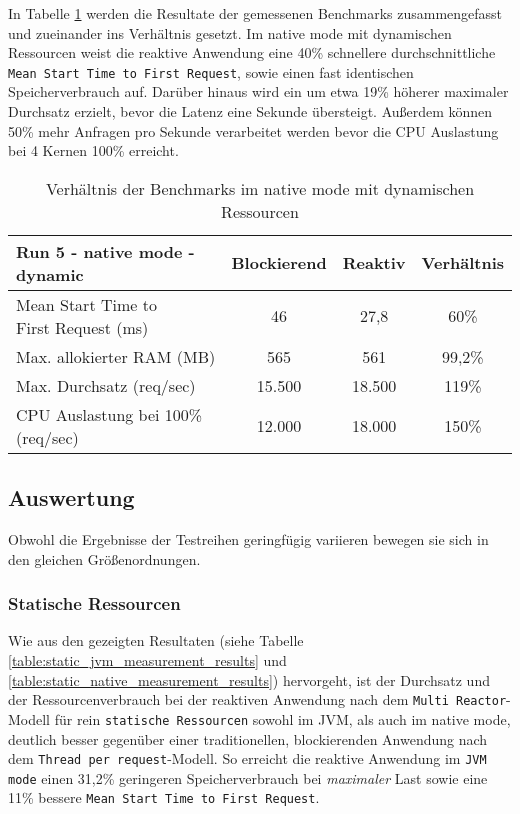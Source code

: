 In Tabelle \ref{table:dynamic_native_measurement_results} werden die Resultate der gemessenen Benchmarks zusammengefasst
und zueinander ins Verhältnis gesetzt. Im native mode mit dynamischen Ressourcen weist die reaktive Anwendung
eine 40\% schnellere durchschnittliche \verb|Mean Start Time to First Request|, sowie einen fast identischen
Speicherverbrauch auf.
Darüber hinaus wird ein um etwa 19\% höherer maximaler Durchsatz erzielt, bevor die Latenz eine Sekunde übersteigt.
Außerdem können 50\% mehr Anfragen pro Sekunde verarbeitet werden bevor die CPU Auslastung bei 4 Kernen 100\% erreicht.

\begin{table}[ht!]
  \begin{tabular}{|l | c | c | c|}
    \hline
    Run 5 - native mode - dynamic & Blockierend & Reaktiv & Verhältnis \\
    \hline
    \makecell[l]{Mean Start Time to                                    \\ First Request (ms)} &   46    &  27,8 &   60\%   \\
    \hline
    Max. allokierter RAM (MB)     & 565         & 561     & 99,2\%     \\
    \hline
    Max. Durchsatz (req/sec)      & 15.500      & 18.500  & 119\%      \\
    \hline
    \makecell[l]{CPU Auslastung bei 100\%                              \\(req/sec)} & 12.000 & 18.000 & 150\%  \\
    \hline
  \end{tabular}
  \caption{Verhältnis der Benchmarks im native mode mit dynamischen Ressourcen}
  \label{table:dynamic_native_measurement_results}
\end{table}
\newpage
\subsection{Auswertung}
\label{subsubsec:auswertung}
Obwohl die Ergebnisse der Testreihen geringfügig variieren bewegen sie sich in den gleichen Größenordnungen.
\subsubsection{Statische Ressourcen}
\label{subsubsec:auswertung_static}
Wie aus den gezeigten Resultaten (siehe Tabelle \ref{table:static_jvm_measurement_results} und
\ref{table:static_native_measurement_results}) hervorgeht, ist der Durchsatz und der Ressourcenverbrauch bei der
reaktiven Anwendung nach dem \verb|Multi Reactor|-Modell für rein \verb|statische Ressourcen| sowohl im JVM, als auch im native mode,
deutlich besser gegenüber einer traditionellen, blockierenden Anwendung nach dem \verb|Thread per request|-Modell.\newline
So erreicht die reaktive Anwendung im \verb|JVM mode| einen 31,2\% geringeren Speicherverbrauch bei \textit{maximaler} Last
sowie eine 11\% bessere \verb|Mean Start Time to First Request|.

